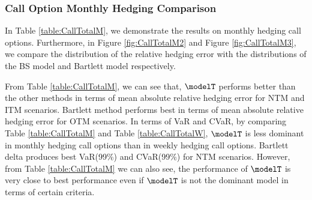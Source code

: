 \subsubsection{Call Option Monthly Hedging Comparison}
In Table \ref{table:CallTotalM}, we demonstrate the results on monthly hedging call options. Furthermore, in Figure \ref{fig:CallTotalM2} and  Figure \ref{fig:CallTotalM3}, we compare the distribution of the relative hedging error with the distributions of the BS model and Bartlett model respectively.

From Table \ref{table:CallTotalM}, we can see that, $\modelT$ performs better than the other  methods in terms of 
mean absolute relative hedging error for NTM and ITM scenarios. Bartlett method performs best in terms of 
mean absolute relative hedging error for OTM scenarios. In terms of VaR and CVaR, by comparing Table \ref{table:CallTotalM} and Table \ref{table:CallTotalW}, $\modelT$ is less dominant  in monthly hedging call options than in weekly hedging call options.  Bartlett delta produces best VaR(99\%) and CVaR(99\%) for NTM scenarios. However, from Table \ref{table:CallTotalM} we can also see, the performance of $\modelT$ is  very close to best performance even if  $\modelT$ is not the dominant model in terms of certain criteria.
